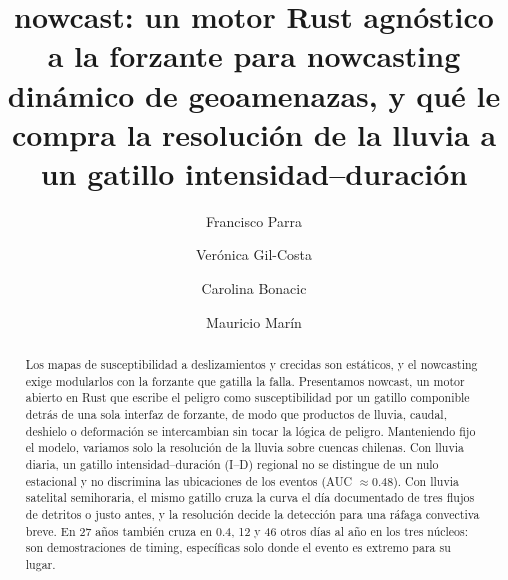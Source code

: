 \documentclass[authoryear,preprint,review,12pt]{elsarticle}
\begin{document}
\begin{frontmatter}

\title{nowcast: un motor Rust agnóstico a la forzante para nowcasting dinámico
de geoamenazas, y qué le compra la resolución de la lluvia a un gatillo
intensidad--duración}

\author[1]{Francisco Parra}
\author[2]{Verónica Gil-Costa}
\author[1]{Carolina Bonacic}
\author[1]{Mauricio Marín}


\begin{abstract}
Los mapas de susceptibilidad a deslizamientos y crecidas son estáticos, y el nowcasting exige modularlos con la forzante que gatilla la falla. Presentamos nowcast, un motor abierto en Rust que escribe el peligro como susceptibilidad por un gatillo componible detrás de una sola interfaz de forzante, de modo que productos de lluvia, caudal, deshielo o deformación se intercambian sin tocar la lógica de peligro. Manteniendo fijo el modelo, variamos solo la resolución de la lluvia sobre cuencas chilenas. Con lluvia diaria, un gatillo intensidad--duración (I--D) regional no se distingue de un nulo estacional y no discrimina las ubicaciones de los eventos (AUC $\approx 0.48$). Con lluvia satelital semihoraria, el mismo gatillo cruza la curva el día documentado de tres flujos de detritos o justo antes, y la resolución decide la detección para una ráfaga convectiva breve. En 27 años también cruza en 0.4, 12 y 46 otros días al año en los tres núcleos: son demostraciones de timing, específicas solo donde el evento es extremo para su lugar.
\end{abstract}


\end{frontmatter}
\end{document}
